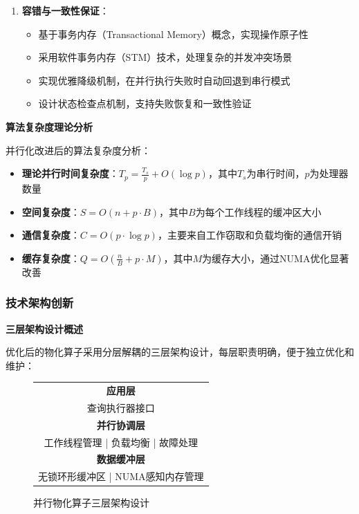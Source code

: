 \begin{enumerate}
    \item \textbf{容错与一致性保证}：
    \begin{itemize}
        \item 基于事务内存（Transactional Memory）概念，实现操作原子性
        \item 采用软件事务内存（STM）技术，处理复杂的并发冲突场景
        \item 实现优雅降级机制，在并行执行失败时自动回退到串行模式
        \item 设计状态检查点机制，支持失败恢复和一致性验证
    \end{itemize}
\end{enumerate}

\textbf{算法复杂度理论分析}

并行化改进后的算法复杂度分析：

\begin{itemize}
    \item \textbf{理论并行时间复杂度}：$T_p = \frac{T_s}{p} + O(\log p)$，其中$T_s$为串行时间，$p$为处理器数量
    \item \textbf{空间复杂度}：$S = O(n + p \cdot B)$，其中$B$为每个工作线程的缓冲区大小
    \item \textbf{通信复杂度}：$C = O(p \cdot \log p)$，主要来自工作窃取和负载均衡的通信开销
    \item \textbf{缓存复杂度}：$Q = O(\frac{n}{B} + p \cdot M)$，其中$M$为缓存大小，通过NUMA优化显著改善
\end{itemize}

\subsubsection{技术架构创新}

\textbf{三层架构设计概述}

优化后的物化算子采用分层解耦的三层架构设计，每层职责明确，便于独立优化和维护：

\begin{figure}[htbp]
\centering
\begin{tabular}{|c|}
\hline
\textbf{应用层} \\
查询执行器接口 \\
\hline
\textbf{并行协调层} \\
工作线程管理 | 负载均衡 | 故障处理 \\
\hline
\textbf{数据缓冲层} \\
无锁环形缓冲区 | NUMA感知内存管理 \\
\hline
\end{tabular}
\caption{并行物化算子三层架构设计}
\end{figure}

